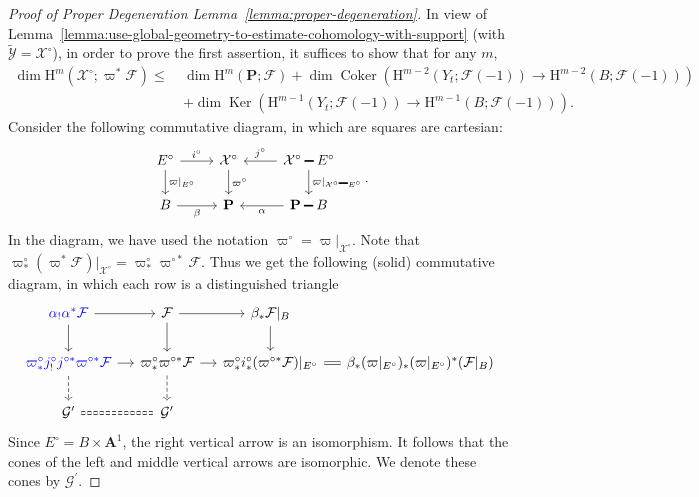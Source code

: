 \documentclass[english]{smfart}
\renewcommand{\setminus}{\mathbin{\rule[0.2em]{0.67em}{0.12em}}}%
\renewcommand{\mathbb}{\mathbf}
\renewcommand{\leq}{\leqslant}
\theoremstyle{remark}
\theoremstyle{plain}
\theoremstyle{definition}
\numberwithin{equation}{remark}
\theoremstyle{void}
\begin{document}
\begin{proof}[Proof of Proper Degeneration Lemma~\ref{lemma:proper-degeneration}]
In view of
Lemma~\ref{lemma:use-global-geometry-to-estimate-cohomology-with-support}
(with \(\widetilde{\mathcal{Y}} = \mathcal{X}^{\circ}\)),
in order to prove the first assertion,
it suffices to show that for any \(m\),
\begin{align}\label{eq:bounding-global-betti}
  \dim \mathrm{H}^{m}(\mathcal{X}^{\circ};\varpi^{\ast}\mathcal{F})
  \leq\ & \dim  \mathrm{H}^{m}(\mathbb{P};\mathcal{F})
             + \dim \operatorname{Coker}(\mathrm{H}^{m-2}(Y_{t};\mathcal{F}(-1)) \to \mathrm{H}^{m-2}(B;\mathcal{F}(-1))) \\
           & +\dim  \operatorname{Ker}(\mathrm{H}^{m-1}(Y_{t};\mathcal{F}(-1)) \to \mathrm{H}^{m-1}(B;\mathcal{F}(-1))). \nonumber
\end{align}
Consider the following commutative diagram, in which are squares are
cartesian:
\begin{equation*}
\begin{tikzcd}
E^{\circ} \ar[r,"i^{\circ}"] \ar[d,"\varpi|_{E^{\circ}}"] & \mathcal{X}^{\circ} \ar[d,"\varpi^{\circ}"] & \mathcal{X}^{\circ}\setminus E^{\circ} \ar[l,swap,"j^{\circ}"] \ar[d,"\varpi|_{\mathcal{X}^{\circ}\setminus E^{\circ}}"]\\
B \ar[r,swap,"\beta"] & \mathbb{P} & \mathbb{P}\setminus B \ar[l,"\alpha"]
\end{tikzcd}.
\end{equation*}
In the diagram, we have used the notation \(\varpi^{\circ}=\varpi|_{\mathcal{X}^{\circ}}\).
Note that
\(\varpi^{\circ}_{\ast}(\varpi^{\ast}\mathcal{F})|_{\mathcal{X}^{\circ}}=\varpi^{\circ}_{\ast}\varpi^{\circ\ast}\mathcal{F}\).
Thus we get the following (solid)
commutative diagram, in which each row is a distinguished triangle
\begin{equation}
\label{eq:diagram-compare}
\begin{tikzcd}[column sep=small]
\mathcolor{blue}{\alpha_{!}\alpha^{\ast}\mathcal{F}} \ar[r] \ar[d]& \mathcal{F} \ar[d] \ar[r] & \beta_{\ast}\mathcal{F}|_{B} \ar[d]\\
\mathcolor{blue}{\varpi_{\ast}^{\circ}j_{!}^{\circ}j^{\circ\ast}\varpi^{\circ\ast}\mathcal{F}} \ar[r] \ar[d,dashed]
& \varpi^{\circ}_{\ast}\varpi^{\circ\ast}\mathcal{F} \ar[r] \ar[d,dashed]&
\varpi^{\circ}_{\ast}i^{\circ}_{\ast}(\varpi^{\circ\ast}\mathcal{F})|_{E^{\circ}} \ar[r,equal]  & \beta_{\ast}(\varpi|_{E^{\circ}})_{\ast}(\varpi|_{E^{\circ}})^{\ast}(\mathcal{F}|_{B}) \\
\mathcal{G}^{\prime} \ar[r,equal,dashed] & \mathcal{G}^{\prime}
\end{tikzcd}
\end{equation}
Since \(E^{\circ}=B \times \mathbb{A}^{1}\),
the right vertical arrow is an isomorphism.  It follows
that the cones of the left and middle vertical arrows are isomorphic.
We denote these cones by \(\mathcal{G}^{\prime}\).


\end{proof}
\end{document}
